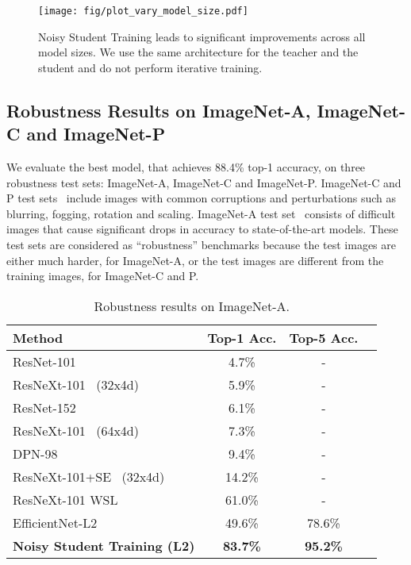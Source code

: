 \documentclass[10pt,twocolumn,letterpaper]{article}
\begin{document}
\begin{figure}[h!]
    \centering
    \texttt{[image: fig/plot\_vary\_model\_size.pdf]}
    \caption{Noisy Student Training leads to significant improvements across all model sizes. We use the same architecture for the teacher and the student and do not perform iterative training.}
    \label{fig:vary_model_size}
\end{figure}

\subsection{Robustness Results on ImageNet-A, ImageNet-C and ImageNet-P}



We evaluate the best model, that achieves 88.4\% top-1 accuracy, on three robustness test sets: ImageNet-A, ImageNet-C and ImageNet-P. ImageNet-C and P test sets~\cite{hendrycks2018benchmarking} include images with common corruptions and perturbations such as blurring, fogging, rotation and scaling. ImageNet-A test set~\cite{hendrycks2019natural} consists of difficult images that cause significant drops in accuracy to state-of-the-art models. These test sets are considered as ``robustness'' benchmarks because the test images are either much harder, for ImageNet-A, or the test images are different from the training images, for ImageNet-C and P. 



\begin{table}[h!]
\small
    \centering 
        \begin{tabular}{l|ccc}                                                
        \toprule 
        Method &  Top-1 Acc. & Top-5 Acc. \\
        \midrule      
        ResNet-101~\cite{hendrycks2019natural} & 4.7\% & - \\
        ResNeXt-101~\cite{hendrycks2019natural} (32x4d) & 5.9\% & -  \\
        ResNet-152~\cite{hendrycks2019natural} & 6.1\% & - \\
        ResNeXt-101~\cite{hendrycks2019natural} (64x4d) & 7.3\% & - \\
        DPN-98~\cite{hendrycks2019natural} & 9.4\% & - \\
        ResNeXt-101+SE~\cite{hendrycks2019natural} (32x4d) &  14.2\% & - \\
        ResNeXt-101 WSL~\cite{mahajan2018exploring,orhan2019robustness} & 61.0\% & - \\
        \midrule
	    EfficientNet-L2  &  49.6\% & 78.6\%   \\
		\bf Noisy Student Training (L2) & \bf 83.7\% & \bf 95.2\%  \\
        \bottomrule
        \end{tabular}
    \caption{Robustness results on ImageNet-A.}  
    \label{tab:robustness1}
\end{table}
\end{document}
